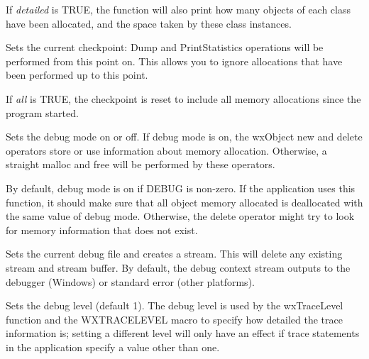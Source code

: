 If {\it detailed} is TRUE, the function will also print how many
objects of each class have been allocated, and the space taken by
these class instances.




Sets the current checkpoint: Dump and PrintStatistics operations will
be performed from this point on. This allows you to ignore allocations
that have been performed up to this point.

If {\it all} is TRUE, the checkpoint is reset to include all
memory allocations since the program started.



Sets the debug mode on or off. If debug mode is on, the wxObject new and delete
operators store or use information about memory allocation. Otherwise,
a straight malloc and free will be performed by these operators.

By default, debug mode is on if DEBUG is non-zero. If the application
uses this function, it should make sure that all object memory allocated
is deallocated with the same value of debug mode. Otherwise, the
delete operator might try to look for memory information that does not
exist.



Sets the current debug file and creates a stream. This will delete any existing
stream and stream buffer. By default, the debug context stream
outputs to the debugger (Windows) or standard error (other platforms).



Sets the debug level (default 1). The debug level is used by the wxTraceLevel function and
the WXTRACELEVEL macro to specify how detailed the trace information is; setting
a different level will only have an effect if trace statements in the application
specify a value other than one.



